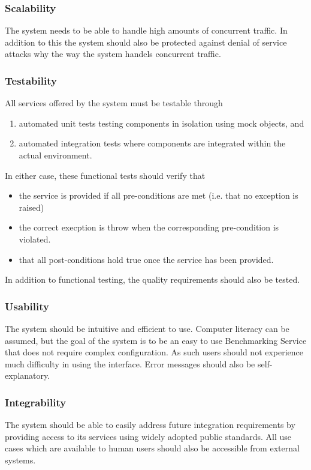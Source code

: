 \subsubsection{Scalability}
The system needs to be able to handle high amounts of concurrent traffic.
In addition to this the system should also be protected against
denial of service attacks why the way the system handels concurrent traffic.

\subsubsection{Testability}
All services offered by the system must be testable through
\begin{enumerate}
	\item automated unit tests testing components in isolation using mock objects, and
	\item automated integration tests where components are integrated within the actual environment.
\end{enumerate}

In either case, these functional tests should verify that
\begin{itemize}
	\item the service is provided if all pre-conditions are met (i.e. that no exception is raised)
	\item the correct execption is throw when the corresponding pre-condition
	is violated.
	\item that all post-conditions hold true once the service has been provided.
\end{itemize}

In addition to functional testing, the quality requirements should also be tested.

\subsubsection{Usability}
The system should be intuitive and efficient to use. Computer literacy can be
assumed, but the goal of the system is to be an easy to use Benchmarking
Service that does not require complex configuration. As such users should
not experience much difficulty in using the interface. Error messages should
also be self-explanatory.

\subsubsection{Integrability}
The system should be able to easily address future integration requirements
by providing access to its services using widely adopted public standards.
All use cases which are available to human users should also be accessible from external systems.


